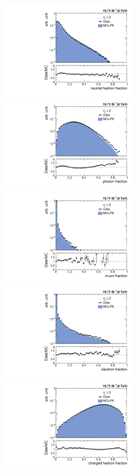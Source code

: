 \begin{figure}[!htbp]
 \begin{center}
 \includegraphics[width=0.5\textwidth]{Plots_HT_2_150/Comparison_NuHadFrac_2_HT_2_150.pdf}%
 ~~\includegraphics[width=0.5\textwidth]{Plots_HT_2_150/Comparison_PhFrac_2_HT_2_150.pdf}\\
 \includegraphics[width=0.5\textwidth]{Plots_HT_2_150/Comparison_MuFrac_2_HT_2_150.pdf}%
 ~~\includegraphics[width=0.5\textwidth]{Plots_HT_2_150/Comparison_ElFrac_2_HT_2_150.pdf}\\
 \includegraphics[width=0.5\textwidth]{Plots_HT_2_150/Comparison_ChHadFrac_2_HT_2_150.pdf}%

\end{center}
\end{figure}
